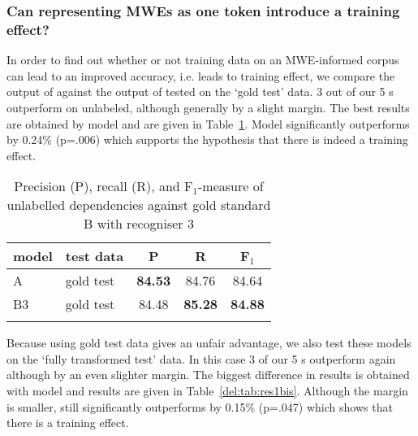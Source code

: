 \documentclass[output=paper]{langsci/langscibook}
\begin{document}
\subsubsection{Can representing MWEs as one token introduce a training effect?}

\indent In order to find out whether or not training data on an MWE-informed corpus can lead to an improved accuracy, i.e. leads to training effect, we compare the output of {\modelB} against the output of {\modelA} tested on the `gold test' data. 3 out of our 5 {\modelB} s outperform {\modelA} on unlabeled, although generally by a slight margin. The best results are obtained by model and are given in Table~\ref{del:tab:res1}. Model significantly outperforms {\modelA} by 0.24\% (p=.006) which supports the hypothesis that there is indeed a training effect.

\begin{table}[h]
    \centering
    \begin{tabular}{l l c c c} %
      \lsptoprule
        \textnormal{model}
        & \textnormal{test data}
        & \textnormal{P}
        & \textnormal{R}
        & \textnormal{F$_1$}
        \\ %
        \midrule
        A & gold test &\textbf{84.53}  &84.76 &84.64 \\
        B3 & gold test &84.48  &\textbf{85.28}  &\textbf{84.88} \tabularnewline %
        \lspbottomrule
    \end{tabular}
    \caption{Precision (P), recall (R), and F$_1$-measure of unlabelled dependencies against gold standard B with recogniser 3 \label{del:tab:res1}}
\end{table}

\indent Because using gold test data gives {\modelB} an unfair advantage, we also test these models on the `fully transformed test' data. In this case 3 of our 5 {\modelB} s outperform {\modelA} again although by an even slighter margin. The biggest difference in results is obtained with model and results are given in Table~\ref{del:tab:res1bis}. Although the margin is smaller, {\modelB} still significantly outperforms {\modelA} by 0.15\% (p=.047) which shows that there is a training effect.
\end{document}
